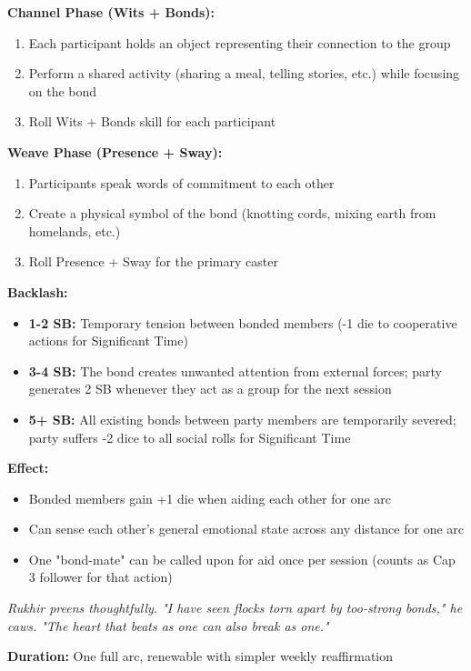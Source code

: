 \documentclass[12pt,twoside]{book}
\newcommand{\shadow}[1]{\textit{#1}}
\begin{document}
\textbf{Channel Phase (Wits + Bonds):}
\begin{enumerate}
\item Each participant holds an object representing their connection to the group
\item Perform a shared activity (sharing a meal, telling stories, etc.) while focusing on the bond
\item Roll Wits + Bonds skill for each participant
\end{enumerate}

\textbf{Weave Phase (Presence + Sway):}
\begin{enumerate}
\item Participants speak words of commitment to each other
\item Create a physical symbol of the bond (knotting cords, mixing earth from homelands, etc.)
\item Roll Presence + Sway for the primary caster
\end{enumerate}

\textbf{Backlash:}
\begin{itemize}
\item \textbf{1-2 SB:} Temporary tension between bonded members (-1 die to cooperative actions for Significant Time)
\item \textbf{3-4 SB:} The bond creates unwanted attention from external forces; party generates 2 SB whenever they act as a group for the next session
\item \textbf{5+ SB:} All existing bonds between party members are temporarily severed; party suffers -2 dice to all social rolls for Significant Time
\end{itemize}

\textbf{Effect:}
\begin{itemize}
\item Bonded members gain +1 die when aiding each other for one arc
\item Can sense each other's general emotional state across any distance for one arc
\item One "bond-mate" can be called upon for aid once per session (counts as Cap 3 follower for that action)
\end{itemize}

\shadow{Rukhir preens thoughtfully. "I have seen flocks torn apart by too-strong bonds," he caws. "The heart that beats as one can also break as one."}

\textbf{Duration:} One full arc, renewable with simpler weekly reaffirmation
\end{document}
